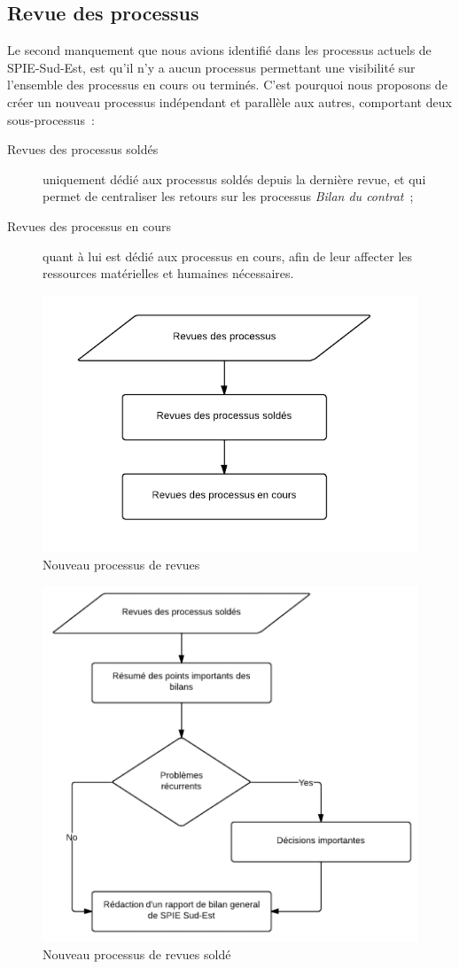 \subsection{Revue des processus}

Le second manquement que nous avions identifié dans les processus actuels de SPIE-Sud-Est, est qu'il n'y a aucun processus permettant une visibilité sur l'ensemble des processus en cours ou terminés.
C'est pourquoi nous proposons de créer un nouveau processus indépendant et parallèle aux autres, comportant deux sous-processus~:

\begin{description}
    \item[Revues des processus soldés] uniquement dédié aux processus soldés depuis la dernière revue, et qui permet de centraliser les retours sur les processus \textit{Bilan du contrat}~;
    \item[Revues des processus en cours] quant à lui est dédié aux processus en cours, afin de leur affecter les ressources matérielles et humaines nécessaires.
\end{description}

\begin{figure}[h!]
	\centering
	\includegraphics[width=0.45\linewidth]{images/processus_revues.png}
	\caption{Nouveau processus de revues}
	\label{fig:processusRevue}
\end{figure}

\begin{figure}[h!]
	\centering
	\includegraphics[width=0.45\linewidth]{images/processus_revues_solde.png}
	\caption{Nouveau processus de revues sold\'e}
	\label{fig:processusRevueSolde}
\end{figure}

